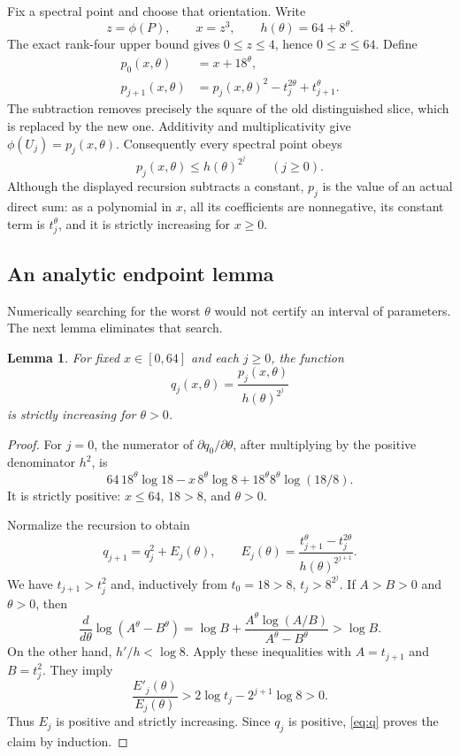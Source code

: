 \documentclass[11pt]{article}
\newtheorem{lemma}[theorem]{Lemma}
\theoremstyle{definition}\newtheorem{definition}[theorem]{Definition}
\theoremstyle{remark}\newtheorem{remark}[theorem]{Remark}
\begin{document}
Fix a spectral point and choose that orientation. Write
\[
z=\phi(P),\qquad x=z^3,\qquad h(\theta)=64+8^\theta.
\]
The exact rank-four upper bound gives $0\leq z\leq4$, hence $0\leq x\leq64$.
Define
\begin{align}\label{eq:p}
p_0(x,\theta)&=x+18^\theta,\\
p_{j+1}(x,\theta)&=p_j(x,\theta)^2-t_j^{2\theta}+t_{j+1}^{\theta}.
\nonumber
\end{align}
The subtraction removes precisely the square of the old distinguished slice,
which is replaced by the new one. Additivity and multiplicativity give
$\phi(U_j)=p_j(x,\theta)$. Consequently every spectral point obeys
\begin{equation}\label{eq:spectralconstraint}
p_j(x,\theta)\leq h(\theta)^{2^j}\qquad(j\geq0).
\end{equation}
Although the displayed recursion subtracts a constant, $p_j$ is the value of an
actual direct sum: as a polynomial in $x$, all its coefficients are
nonnegative, its constant term is $t_j^\theta$, and it is strictly increasing
for $x\geq0$.

\subsection{An analytic endpoint lemma}
Numerically searching for the worst $\theta$ would not certify an interval of
parameters. The next lemma eliminates that search.

\begin{lemma}\label{lem:endpoint}
For fixed $x\in[0,64]$ and each $j\geq0$, the function
\[
q_j(x,\theta)=\frac{p_j(x,\theta)}{h(\theta)^{2^j}}
\]
is strictly increasing for $\theta>0$.
\end{lemma}
\begin{proof}
For $j=0$, the numerator of $\partial q_0/\partial\theta$, after multiplying
by the positive denominator $h^2$, is
\[
64\,18^\theta\log18-x\,8^\theta\log8
+18^\theta8^\theta\log(18/8).
\]
It is strictly positive: $x\leq64$, $18>8$, and $\theta>0$.

Normalize the recursion to obtain
\begin{equation}\label{eq:q}
q_{j+1}=q_j^2+E_j(\theta),\qquad
E_j(\theta)=\frac{t_{j+1}^{\theta}-t_j^{2\theta}}
                 {h(\theta)^{2^{j+1}}}.
\end{equation}
We have $t_{j+1}>t_j^2$ and, inductively from $t_0=18>8$,
$t_j>8^{2^j}$. If $A>B>0$ and $\theta>0$, then
\[
\frac{d}{d\theta}\log(A^\theta-B^\theta)
=\log B+\frac{A^\theta\log(A/B)}{A^\theta-B^\theta}>\log B.
\]
On the other hand, $h'/h<\log8$. Apply these inequalities with
$A=t_{j+1}$ and $B=t_j^2$. They imply
\[
\frac{E'_j(\theta)}{E_j(\theta)}
>2\log t_j-2^{j+1}\log8>0.
\]
Thus $E_j$ is positive and strictly increasing. Since $q_j$ is positive,
\eqref{eq:q} proves the claim by induction.
\end{proof}
\end{document}
